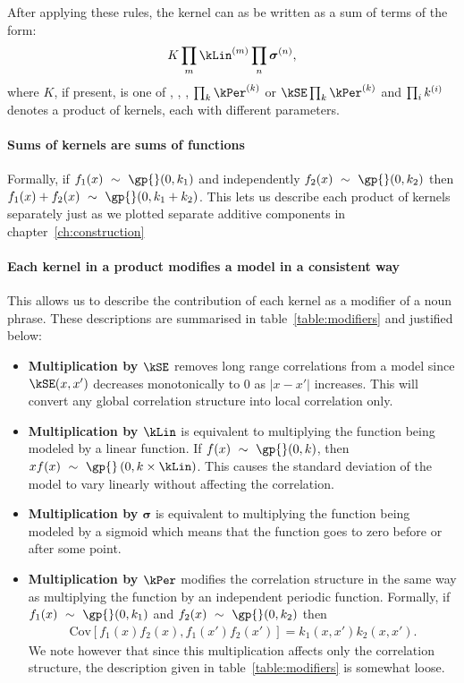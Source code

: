 After applying these rules, the kernel can as be written as a sum of terms of the form:
\begin{align*}
K \prod_m \kLin^{(m)} \prod_n \boldsymbol\sigma^{(n)},
\label{eq:sop}
\end{align*}
where $K$, if present, is one of \kWN, \kC, \kSE, $\prod_k \kPer^{(k)}$ or $\kSE \prod_k \kPer^{(k)}$
and $\prod_ik^{(i)}$ denotes a product of kernels, each with different parameters.


\paragraph{Sums of kernels are sums of functions}
Formally, if $f_1(x) \dist \gp{}(0, \kernel_1)$ and independently $f_2(x) \dist \gp{}(0, \kernel_2)$ then ${f_1(x) + f_2(x) \dist \gp{}(0, \kernel_1 + \kernel_2)}$.
This lets us describe each product of kernels separately just as we plotted separate additive components in chapter~\ref{ch:construction}

\paragraph{Each kernel in a product modifies a model in a consistent way}
This allows us to describe the contribution of each kernel as a modifier of a noun phrase.
These descriptions are summarised in table~\ref{table:modifiers} and justified below:

\begin{itemize}
\item {\bf Multiplication by $\kSE$} removes long range correlations from a model since $\kSE(x,x')$ decreases monotonically to 0 as $|x - x'|$ increases.
This will convert any global correlation structure into local correlation only.
\item {\bf Multiplication by $\kLin$} is equivalent to multiplying the function being modeled by a linear function.
If $f(x) \dist \gp{}(0, \kernel)$, then $xf(x) \dist \gp{}\left(0, k \times \kLin \right)$.
This causes the standard deviation of the model to vary linearly without affecting the correlation.
\item {\bf Multiplication by $\boldsymbol\sigma$} is equivalent to multiplying the function being modeled by a sigmoid which means that the function goes to zero before or after some point.
\item {\bf Multiplication by $\kPer$}
modifies the correlation structure in the same way as multiplying the function by an independent periodic function.
Formally, if ${f_1(x) \dist \gp{}(0, \kernel_1)}$ and ${f_2(x) \dist \gp{}(0, \kernel_2)}$ then
\begin{align}
{\textrm{Cov} \left[f_1(x)f_2(x), f_1(x')f_2(x') \right] = k_1(x,x')k_2(x,x')}.\nonumber
\end{align}
We note however that since this multiplication affects only the correlation structure, the description given in table~\ref{table:modifiers} is somewhat loose.
\end{itemize}

